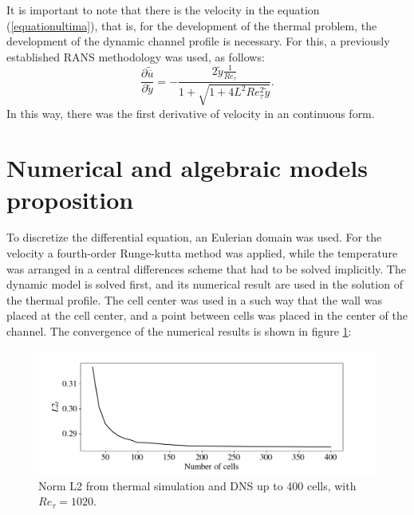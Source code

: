 \documentclass[10pt]{article} %
\begin{document}
It is important to note that there is the velocity in the equation (\ref{equationultima}), that is, for the development of the thermal problem, the development of the dynamic channel profile is necessary. For this, a previously established RANS methodology \cite{Luigi} was used, as follows:
\begin{equation}\label{finalequationvelocity}	
\frac{\partial \tilde{\overline{u}}}{\partial \tilde{y}} = - \frac{2 \tilde{y} \frac{1}{Re_\tau} }{ 1 + \sqrt{ 1 + 4 L ^2 Re_\tau ^2 \tilde{y}}}.
\end{equation}	
In this way, there was the first derivative of velocity in an continuous form.

\newpage

\section{Numerical and algebraic models proposition}


To discretize the differential equation, an Eulerian domain was used. For the velocity a fourth-order Runge-kutta method was applied, while the temperature was arranged in a central differences scheme that had to be solved implicitly. The dynamic model is solved first, and its numerical result are used in the solution of the thermal profile. The cell center was used in a such way that the wall was placed at the cell center, and a point between cells was placed in the center of the channel. The convergence of the numerical results is shown in figure \ref{sistema}:

\begin{figure}[!h]
	\centering
	\includegraphics[angle=0, trim={10mm 0mm 0mm 0mm}, clip , scale=0.50]{fotos_formatacao_final/Convergence}
	\caption{Norm L2 from thermal simulation and DNS up to 400 cells, with $Re_\tau = 1020$.}
	\label{sistema}
\end{figure}
\end{document}
